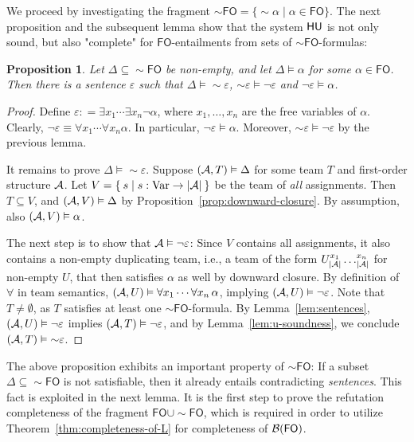 \documentclass[a4paper,english,fleqn,11pt,final]{scrartcl}
\makeatletter
\newcommand{\ie}{i.e.\@\xspace}
\newcommand{\size}[1]{{\protect\ensuremath{\vert\nobreak#1\nobreak\vert}}}
\newcommand{\negg}{{\sim}}
\newcommand{\logic}[1]{\ensuremath{\mathsf{#1}}\xspace}
\newcommand{\FO}{\logic{FO}}
\newcommand{\Var}{\mathrm{Var}}
\newcommand{\calA}{\protect\ensuremath{\mathcal{A}}}
\newcommand{\calB}{\protect\ensuremath{\mathcal{B}}}
\newcommand{\sfH}{\protect\ensuremath{\mathsf{H}}}
\newcommand{\sfU}{\protect\ensuremath{\mathsf{U}}}
\providecommand{\dfn}{\mathrel{\mathop:}=}
\theoremstyle{plain}
\newtheorem{proposition}[theorem]{Proposition}
\theoremstyle{definition}
\makeatother
\begin{document}
We proceed by investigating the fragment $\negg \FO=\{ \negg \alpha \mid \alpha \in \FO\}$.
The next proposition and the subsequent lemma show that the system $\sfH\sfU$ is not only sound, but also "complete" for $\FO$-entailments from sets of $\negg\FO$-formulas:



\begin{proposition}
Let $\Delta \subseteq \negg \FO$ be non-empty, and let $\Delta \vDash \alpha$ for some $\alpha\in \FO$.
Then there is a sentence $\varepsilon$ such that $\Delta \vDash \negg \varepsilon$, $\negg \varepsilon \vDash \neg \varepsilon$ and $\neg \varepsilon \vDash \alpha$.
\end{proposition}
\begin{proof}
Define $\varepsilon \dfn \exists x_1 \cdots \exists x_n \neg \alpha$, where $x_1,\ldots,x_n$ are the free variables of $\alpha$.
Clearly, $\neg \varepsilon \equiv \forall x_1 \cdots \forall x_n \alpha$.
In particular, $\neg \varepsilon \vDash \alpha$.
Moreover, $\negg \varepsilon \vDash \neg \varepsilon$ by the previous lemma.

It remains to prove $\Delta \vDash \negg \varepsilon$.
Suppose $(\calA, T)\vDash \Delta$ for some team $T$ and first-order structure $\calA$.
Let $V=\Set{ s | s : \Var \to \size{\calA} }$ be the team of \emph{all} assignments.
Then $T \subseteq V$, and $(\calA, V)\vDash \Delta$ by Proposition~\ref{prop:downward-closure}.
By assumption, also $(\calA, V)\vDash \alpha$.

The next step is to show that $\calA \vDash \neg\varepsilon$: Since $V$ contains all assignments, it also contains a non-empty duplicating team, \ie, a team of the form $U^{x_1}_{\size{\calA}}\ldots^{x_n}_{\size{\calA}}$ for non-empty $U$, that then satisfies $\alpha$ as well by downward closure.
By definition of $\forall$ in team semantics, $(\calA,U) \vDash \forall x_1 \cdots \forall x_n \, \alpha$, implying $(\calA,U) \vDash \neg \varepsilon$.
Note that $T \neq \emptyset$, as $T$ satisfies at least one $\negg\FO$-formula.
By Lemma~\ref{lem:sentences},  $(\calA, U)\vDash \neg \varepsilon$ implies $(\calA,T) \vDash \neg \varepsilon$, and by Lemma~\ref{lem:u-soundness}, we conclude $(\calA, T)\vDash \negg \varepsilon$.
\end{proof}

The above proposition exhibits an important property of $\negg\FO$: If a subset $\Delta  \subseteq \negg \FO$ is not satisfiable, then it already entails contradicting \emph{sentences}.
This fact is exploited in the next lemma.
It is the first step to prove the refutation completeness of the fragment $\FO \cup \negg \FO$, which is required in order to utilize Theorem~\ref{thm:completeness-of-L} for completeness of $\calB(\FO)$.
\end{document}
